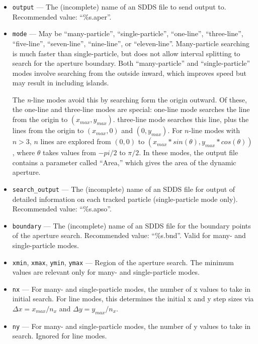 \documentclass[11pt]{article}
\begin{document}
\begin{itemize}
\item \verb|output| --- The (incomplete) name of an SDDS file to send output to.  
 Recommended value: ``\%s.aper''.

\item \verb|mode| --- May be ``many-particle'', ``single-particle'',
``one-line'', ``three-line'', ``five-line'', ``seven-line'',
``nine-line'', or ``eleven-line''.  Many-particle searching is much
faster than single-particle, but does not allow interval splitting to
search for the aperture boundary.  Both ``many-particle'' and
``single-particle'' modes involve searching from the outside inward,
which improves speed but may result in including islands.

The {\em n}-line modes avoid this by searching form the origin
outward.  Of these, the one-line and three-line modes are special:
one-line mode searches the line from the origin to $(x_{max},
y_{max})$.  three-line mode searches this line, plus the lines from
the origin to $(x_{max}, 0)$ and $(0, y_{max})$.  For $n$-line modes
with $n>3$, $n$ lines are explored from $(0,0)$ to
$(x_{max}*sin(\theta), y_{max}*cos(\theta))$, where $\theta$ takes
values from $-pi/2$ to $\pi/2$.   In these modes, the output file contains
a parameter called ``Area,'' which gives the area of the dynamic aperture.

\item \verb|search_output| --- The (incomplete) name of an SDDS file for output of detailed
 information on each tracked particle (single-particle mode only).  Recommended value:
 ``\%s.apso''.

\item \verb|boundary| --- The (incomplete) name of an SDDS 
file for the boundary points of the aperture search.  Recommended value: ``\%s.bnd''.
Valid for many- and single-particle modes.

\item \verb|xmin|, \verb|xmax|, \verb|ymin|, \verb|ymax| --- Region of the aperture search.
The minimum values are relevant only for many- and single-particle modes.

\item \verb|nx| --- For many- and single-particle modes, the number of x values to take in initial search.
  For line modes, this determines the initial x and y step sizes via $\Delta x = x_{max}/n_x$ and
  $\Delta y = y_{max}/n_x$.
\item \verb|ny| --- For many- and single-particle modes, the number of y values to take in search.
  Ignored for line modes.


\end{itemize}
\end{document}
